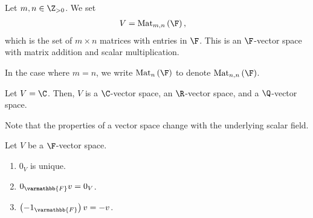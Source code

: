 \documentclass[12pt]{mypackage}
\renewcommand*{\mathbb}[1]{\varmathbb{#1}}
\begin{document}
\begin{example}[Matrices]
  Let $m,n\in \Z_{> 0}$. We set
  \begin{align*}
    V &= \text{Mat}_{m,n}\left(\F\right),
  \end{align*}
  which is the set of $m\times n$ matrices with entries in $\F$. This is an $\F$-vector space with matrix addition and scalar multiplication.\newline

  In the case where $m = n$, we write $\text{Mat}_{n}\left(\F\right)$ to denote $\text{Mat}_{n,n}\left(\F\right)$.
\end{example}
\begin{example}
  Let $V = \C$. Then, $V$ is a $\C$-vector space, an $\R$-vector space, and a $\Q$-vector space.\newline

  Note that the properties of a vector space change with the underlying scalar field.
\end{example}
\begin{lemma}
  Let $V$ be a $\F$-vector space.
  \begin{enumerate}[(1)]
    \item $0_V$ is unique.
    \item $0_{\mathbb{F}}v = 0_V$.
    \item $\left(-1_{\mathbb{F}}\right)v = -v$.
  \end{enumerate}
\end{lemma}
\end{document}
